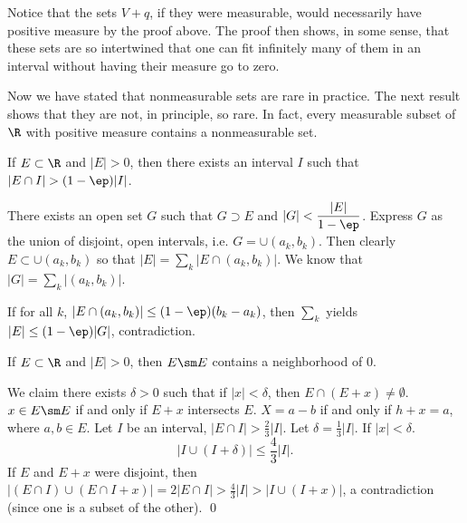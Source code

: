 Notice that the sets $V+q$, if they were measurable, would necessarily have positive measure by the proof above. The proof then shows, in some sense, that these sets are so intertwined that one can fit infinitely many of them in an interval without having their measure go to zero. 

















Now we have stated that nonmeasurable sets are rare in practice. The next result shows that they are not, in principle, so rare. In fact, every measurable subset of $\R$ with positive measure contains a nonmeasurable set. 








\begin{lem} \label{lem:density}
If $E \subset \R$ and $|E|>0$, then there exists an interval $I$ such that $|E \cap I|> (1-\ep) |I|$. 
\end{lem}

\pf There exists an open set $G$ such that $G \supset E$ and $|G|< \dfrac{|E|}{1-\ep}$. Express $G$ as the union of disjoint, open intervals, i.e. $G= \cup (a_k,b_k)$. Then clearly $E \subset  \cup (a_k,b_k)$ so that $|E|= \sum_k |E \cap (a_k,b_k)|$. We know that $|G|= \sum_k |(a_k,b_k)|$. 



If for all $k$, $| E \cap (a_k,b_k)| \leq (1- \ep)(b_k-a_k)$, then $\sum_k$ yields $|E| \leq (1-\ep)|G|$, contradiction. 



\begin{lem} \label{lem:subzero}
If $E \subset \R$ and $|E|>0$, then $E \sm E$ contains a neighborhood of 0. 
\end{lem}



\pf We claim there exists $\delta>0$ such that if $|x|<\delta$, then $E \cap (E+x) \neq \emptyset$. $x \in E \sm E$ if and only if $E+x$ intersects $E$. $X= a-b$ if and only if $h+x=a$, where $a,b \in E$. Let $I$ be an interval, $|E \cap I|> \frac{2}{3} |I|$. Let $\delta= \frac{1}{3} |I|$. If $|x|<\delta$.
	\[
	|I \cup (I+\delta)| \leq \frac{4}{3} |I|. 
	\]
If $E$ and $E+x$ were disjoint, then $| (E \cap I) \cup (E \cap I +x)|= 2|E \cap I|> \frac{4}{3} |I|> |I \cup (I+x)|$, a contradiction (since one is a subset of the other). \qed \\



